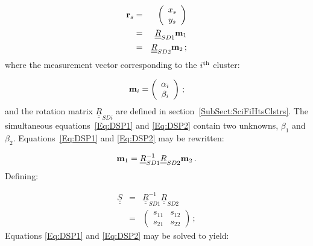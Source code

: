 \begin{eqnarray}
  {\bf r}_s & = & \left( 
                      \begin{array}{c}
                        x_s \\ y_s
                      \end{array}
                     \right)                                  \\
               & = & \underline{\underline{R}}_{SD1} {\bf m}_1 
                                              \label{Eq:DSP1} \\
               & = & \underline{\underline{R}}_{SD2} {\bf m}_2 
                                              \label{Eq:DSP2} \, ;
\end{eqnarray}
where the measurement vector corresponding to the $i^{\rm th}$ cluster: 

\begin{equation}
  {\bf m}_i = \left( 
               \begin{array}{c}
                 \alpha_i \\ \beta_i
               \end{array}
              \right) \, ;
\end{equation}
and the rotation matrix $\underline{\underline{R}}_{SDi}$ are defined in section~\ref{SubSect:SciFiHtsClstrs}. The simultaneous equations~\ref{Eq:DSP1} and \ref{Eq:DSP2} contain two unknowns, $\beta_1$ and $\beta_2$. Equations~\ref{Eq:DSP1} and \ref{Eq:DSP2} may be rewritten:

\begin{equation}
  {\bf m}_1 = \underline{\underline{R}}_{SD1}^{-1}
              \underline{\underline{R}}_{SD2} {\bf m}_2 \, .
\end{equation}
Defining:

\begin{eqnarray}
  \underline{\underline{S}} & = & \underline{\underline{R}}_{SD1}^{-1}
                                  \underline{\underline{R}}_{SD2}     \\
                            & = & \left( 
                                    \begin{array}{cc}
                                      s_{11} & s_{12} \\
                                      s_{21} & s_{22}
                                    \end{array}
                                   \right) \, ;
\end{eqnarray}
Equations \ref{Eq:DSP1} and \ref{Eq:DSP2} may be solved to yield:

